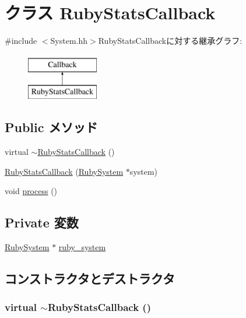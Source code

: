 \hypertarget{classRubyStatsCallback}{
\section{クラス RubyStatsCallback}
\label{classRubyStatsCallback}
}


{\ttfamily \#include $<$System.hh$>$}RubyStatsCallbackに対する継承グラフ:\begin{figure}[H]
\begin{center}
\leavevmode
\includegraphics[height=2cm]{classRubyStatsCallback}
\end{center}
\end{figure}
\subsection*{Public メソッド}
\begin{DoxyCompactItemize}
\item 
virtual \hyperlink{classRubyStatsCallback_a23c82de724037c9a52d90f0a8c487512}{$\sim$RubyStatsCallback} ()
\item 
\hyperlink{classRubyStatsCallback_a99197472a406321ad0919d3b9f54572e}{RubyStatsCallback} (\hyperlink{classRubySystem}{RubySystem} $\ast$system)
\item 
void \hyperlink{classRubyStatsCallback_a2e9c5136d19b1a95fc427e0852deab5c}{process} ()
\end{DoxyCompactItemize}
\subsection*{Private 変数}
\begin{DoxyCompactItemize}
\item 
\hyperlink{classRubySystem}{RubySystem} $\ast$ \hyperlink{classRubyStatsCallback_a88928242e9a532cb6f4abe42dd8240a7}{ruby\_\-system}
\end{DoxyCompactItemize}


\subsection{コンストラクタとデストラクタ}
\hypertarget{classRubyStatsCallback_a23c82de724037c9a52d90f0a8c487512}{
\subsubsection[{$\sim$RubyStatsCallback}]{\setlength{\rightskip}{0pt plus 5cm}virtual $\sim${\bf RubyStatsCallback} ()}}
\label{classRubyStatsCallback_a23c82de724037c9a52d90f0a8c487512}



